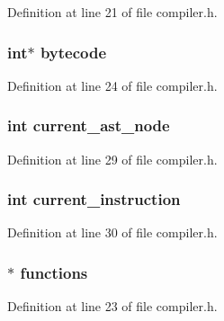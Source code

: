 Definition at line 21 of file compiler.\+h.

\hypertarget{structcompiler_a64b4be20f18afc3c774441d2fcfe6c36}{
\subsubsection[{bytecode}]{\setlength{\rightskip}{0pt plus 5cm}int$\ast$ bytecode}}\label{structcompiler_a64b4be20f18afc3c774441d2fcfe6c36}


Definition at line 24 of file compiler.\+h.

\hypertarget{structcompiler_a29957a44dacbb53d07ba527174855e6b}{
\subsubsection[{current\+\_\+ast\+\_\+node}]{\setlength{\rightskip}{0pt plus 5cm}int current\+\_\+ast\+\_\+node}}\label{structcompiler_a29957a44dacbb53d07ba527174855e6b}


Definition at line 29 of file compiler.\+h.

\hypertarget{structcompiler_a2b9e1ca3ba1703a588f6d160eacad1aa}{
\subsubsection[{current\+\_\+instruction}]{\setlength{\rightskip}{0pt plus 5cm}int current\+\_\+instruction}}\label{structcompiler_a2b9e1ca3ba1703a588f6d160eacad1aa}


Definition at line 30 of file compiler.\+h.

\hypertarget{structcompiler_a06ebce769c4c96b0e3eb5ae512975adf}{
\subsubsection[{functions}]{$\ast$ functions}}\label{structcompiler_a06ebce769c4c96b0e3eb5ae512975adf}


Definition at line 23 of file compiler.\+h.

